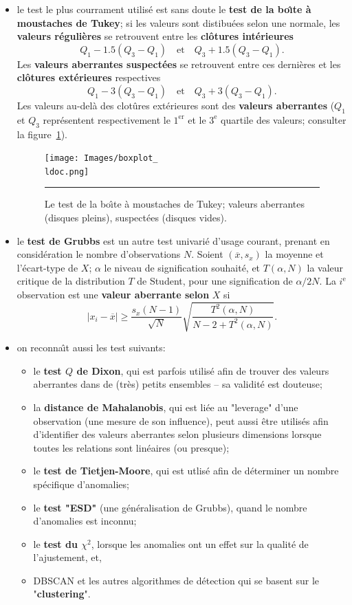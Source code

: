 \begin{itemize}[noitemsep]
\item le test le plus courrament utilis\'e est sans doute le  \textbf{test de la bo\^{\i}te \`a moustaches de Tukey}; si les valeurs sont distibu\'ees selon une normale, les \textbf{valeurs r\'e\-gu\-li\-\`eres} se retrouvent entre les \textbf{cl\^otures int\'erieures} $$Q_1-1.5(Q_3-Q_1) \quad\mbox{et}\quad Q_3+1.5(Q_3-Q_1).$$ Les \textbf{valeurs aberrantes suspect\'ees} se retrouvent entre ces derni\`eres et les \textbf{cl\^otures ext\'erieures} respectives 
$$Q_1-3(Q_3-Q_1) \quad\mbox{et}\quad Q_3+3(Q_3-Q_1).$$
Les valeurs au-del\`a des clot\^ures ext\'erieures sont des \textbf{valeurs aberrantes} ($Q_1$ et $Q_3$ repr\'esentent respectivement le $1^{\textrm{er}}$ et le $3^{\textrm{e}}$ quartile des valeurs; consulter la figure~\ref{fig:boxplot}).
\begin{figure}[t]
\centering
\texttt{[image: Images/boxplot\_\\ldoc.png]}
\caption{\small Le test de la bo\^{\i}te \`a moustaches de Tukey; valeurs aberrantes (disques pleins), suspect\'ees (disques vides).}
\hrule\label{fig:boxplot}
\end{figure}
\afterpage{\FloatBarrier}
\item le \textbf{test de Grubbs} est un autre test univari\'e d'usage courant, prenant en consid\'eration le nombre d'ob\-ser\-va\-tions $N$. Soient  $(\overline{x},s_x)$ la moyenne et l'\'ecart-type de $X$; $\alpha$ le niveau de signification souhait\'e, et $T(\alpha,N)$ la valeur critique de la distribution $T$ de Student, pour une signification de $\alpha/2N$. La $i^{\textrm{e}}$ ob\-ser\-va\-tion est une \textbf{valeur aberrante selon} $X$ si $$|x_i-\overline{x}| \geq \frac{s_x(N-1)}{\sqrt{N}}\sqrt{\frac{T^2(\alpha,N)}{N-2+T^2(\alpha,N)}}.$$
\item on reconna\^{\i}t aussi les test suivants:
\begin{itemize}[noitemsep]
\item le \textbf{test $Q$ de Dixon}, qui est parfois utilisé afin de trouver des valeurs aberrantes dans de (tr\`es) petits ensembles -- sa validit\'e est douteuse;
\item la \textbf{distance de Mahalanobis}, qui est liée au "leverage" d'une ob\-ser\-va\-tion (une mesure de son influence), peut aussi être utilisés afin d'identifier des valeurs aberrantes selon plusieurs dimensions lorsque toutes les relations sont linéaires (ou presque);
\item le \textbf{test de Tietjen-Moore}, qui est utlis\'e afin de d\'eterminer un nombre sp\'ecifique d'anomalies;
\item le \textbf{test "ESD"} (une g\'en\'eralisation de Grubbs), quand le nombre d'anomalies est inconnu;
\item le \textbf{test du $\chi^2$}, lorsque les anomalies ont un effet sur la qualit\'e de l'ajustement, et,   
\item DBSCAN et les autres algorithmes de d\'etection qui se basent sur le "\textbf{clustering}". 
\end{itemize}
\end{itemize}
